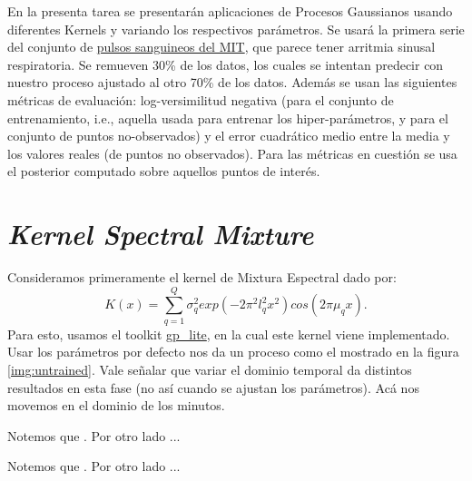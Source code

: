 \documentclass[letterpaper,11pt,oneside]{article}
\theoremstyle{break}
\begin{document}
	





\inserttitle

En la presenta tarea se presentarán aplicaciones de Procesos Gaussianos usando diferentes Kernels y variando los respectivos parámetros. Se usará la primera serie del conjunto de \href{https://ecg.mit.edu/time-series/}{pulsos sanguineos del MIT}, que parece tener arritmia sinusal respiratoria. Se remueven 30\% de los datos, los cuales se intentan predecir con nuestro proceso ajustado al otro 70\% de los datos. Además se usan las siguientes métricas de evaluación: log-versimilitud negativa (para el conjunto de entrenamiento, i.e., aquella usada para entrenar los hiper-parámetros, y para el conjunto de puntos no-observados) y el error cuadrático medio entre la media y los valores reales (de puntos no observados). Para las métricas en cuestión se usa el posterior computado sobre aquellos puntos de interés.

\section{\textit{Kernel Spectral Mixture}}
Consideramos primeramente el kernel de Mixtura Espectral dado por: 
$$K(x)=\displaystyle \sum^Q_{q=1}\sigma^2_q exp(-2\pi^2l^2_qx^2)cos(2\pi\mu_qx).$$
Para esto, usamos el toolkit \href{https://github.com/GAMES-UChile/The_Art_of_Gaussian_Processes}{gp\_lite}, en la cual este kernel viene implementado. Usar los parámetros por defecto nos da un proceso como el mostrado en la figura \ref{img:untrained}. Vale señalar que variar el dominio temporal da distintos resultados en esta fase (no así cuando se ajustan los parámetros). Acá nos movemos en el dominio de los minutos.


Notemos que \lipsum[1]. Por otro lado ...


\lipsum[2]


Notemos que \lipsum[1]. Por otro lado ...



\end{document}
